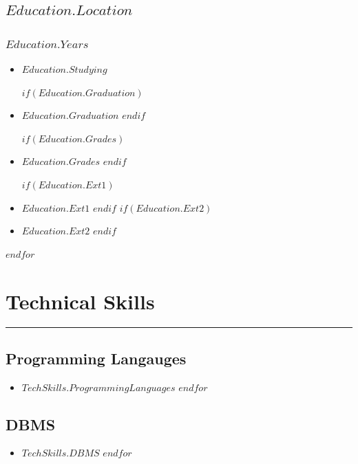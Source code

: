 \documentclass[$fontsize$, a4paper]{article}
\begin{document}
\begin{adjustwidth}{5pt}{5pt}
\begin{multicols*}{2}
                \subsection*{$Education.Location$}
                \subsubsection*{$Education.Years$}
                \begin{itemize}
                    \item  $Education.Studying$

                    $if(Education.Graduation)$
                    \item $Education.Graduation$
                    $endif$

                    $if(Education.Grades)$
                    \item $Education.Grades$
                    $endif$
                    
                    $if(Education.Ext1)$
                    \item  $Education.Ext1$
                    $endif$
                    $if(Education.Ext2)$
                    \item  $Education.Ext2$
                    $endif$
                \end{itemize}
            
            $endfor$
        \section*{Technical Skills}
        \textcolor{RoyalBlue}{\noindent\rule{\linewidth}{1pt}}
                \begin{multicols*}{2}
                    \subsection*{Programming Langauges}
                        \begin{itemize} 
                            $for(TechSkills.ProgrammingLanguages)$
                                \item $TechSkills.ProgrammingLanguages$
                            $endfor$
                        \end{itemize}
                    \subsection*{DBMS}
                        \begin{itemize}
                            $for(TechSkills.DBMS)$
                                \item $TechSkills.DBMS$
                            $endfor$
                        \end{itemize}
                    \columnbreak

\end{multicols*}
\end{multicols*}
\end{adjustwidth}
\end{document}
